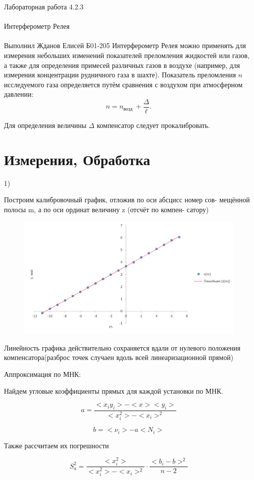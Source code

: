 \documentclass{astroedu-lab}
\begin{document}
\begin{problem}{\huge Лабораторная работа 4.2.3\\\\Интерферометр Релея\\\\Выполнил Жданов Елисей Б01-205}
Интерферометр Релея можно применять для измерения небольших изменений показателей преломления жидкостей или газов, а также для определения примесей различных газов в воздухе (например, для измерения концентрации рудничного газа в шахте). Показатель преломления $n$ исследуемого газа определяется путём сравнения с воздухом при атмосферном давлении:
$$
n=n_{\text {возд }}+\frac{\Delta}{\ell} .
$$

Для определения величины $\Delta$ компенсатор следует прокалибровать.

\section{Измерения, Обработка}

1)

Построим калибровочный график, отложив по оси абсцисс номер сов-
мещённой полосы m, а по оси ординат величину z (отсчёт по компен-
сатору)

\begin{figure}[!h]
	\centering
	\includegraphics[width=1\textwidth]{mz.png}
	\label{fig:boiler}
\end{figure}

Линейность графика действительно сохраняется вдали от нулевого положения компенсатора(разброс точек случаен вдоль всей линеаризационной прямой)

Аппроксимация по МНК:

Найдем угловые коэффициенты прямых для каждой установки по МНК.

\[
	a = \frac{<x_i y_i> - < x > < y_i >}{< x_i^2> - < x_i >^2}
\]

\[
	b = < \nu_i > - a < N_i >
\]

Также рассчитаем их погрешности

\begin{equation}
	S_a^2 = \frac{< x_i^2>}{< x_i^2 > - < x_i >^2} \cdot \frac{<  b_i - b > ^2}{n - 2}
\end{equation}


\end{problem}
\end{document}
